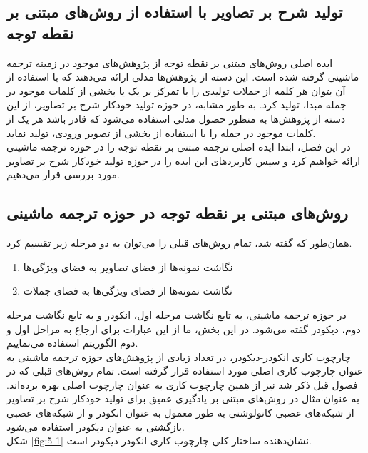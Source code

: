 \subsection{تولید شرح بر تصاویر با استفاده از روش‌های مبتنی بر نقطه توجه}
ایده‌ اصلی روش‌های مبتنی بر نقطه توجه از پژوهش‌های موجود در زمینه ترجمه ماشینی گرفته شده است. این دسته از پژوهش‌ها مدلی ارائه می‌دهند که با استفاده از آن بتوان هر کلمه از جملات تولیدی را با تمرکز بر یک یا بخشی از کلمات موجود در جمله مبدا‌، تولید کرد. به طور مشابه، در حوزه تولید خودکار شرح بر تصاویر، از این دسته از پژوهش‌ها به منظور حصول مدلی استفاده می‌شود که قادر باشد هر یک از کلمات موجود در جمله را با استفاده از بخشی از تصویر ورودی، تولید نماید.
\\
در این فصل، ابتدا ایده اصلی ترجمه مبتنی بر نقطه توجه را در حوزه ترجمه ماشینی ارائه خواهیم کرد و سپس کاربردهای این ایده را در حوزه تولید خودکار شرح بر تصاویر مورد بررسی قرار می‌دهیم. 

\subsection{روش‌های مبتنی بر نقطه توجه در حوزه ترجمه ماشینی}

همان‌طور که گفته شد، تمام روش‌های قبلی را می‌توان به دو مرحله زیر تقسیم کرد.
\begin{enumerate}
\item نگاشت نمونه‌ها از فضای تصاویر به فضای ویژگي‌ها
\item نگاشت نمونه‌ها از فضای ویژگی‌ها به فضای جملات
\end{enumerate}

در حوزه ترجمه ماشینی، به تابع نگاشت مرحله اول، انکودر و به تابع نگاشت مرحله دوم، دیکودر گفته می‌شود. در این بخش، ما از این عبارات برای ارجاع به مراحل اول و دوم الگوریتم استفاده می‌نماییم.
\\
چارچوب کاری انکودر-دیکودر، در تعداد زیادی از پژوهش‌های حوزه ترجمه ماشینی به عنوان چارچوب کاری اصلی مورد استفاده قرار گرفته است. تمام روش‌های قبلی که در فصول قبل ذکر شد نیز از همین چارچوب کاری به عنوان چارچوب اصلی بهره برده‌اند. به عنوان مثال در روش‌های مبتنی بر یادگیری عمیق برای تولید خودکار شرح بر تصاویر از شبکه‌های عصبی کانولوشنی به طور معمول به عنوان انکودر و از شبکه‌های عصبی بازگشتی به عنوان دیکودر استفاده می‌شود.
\\
شکل \ref{fig:5-1} نشان‌دهنده ساختار کلی چارچوب کاری انکودر-دیکودر است.

